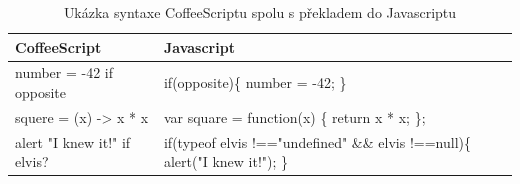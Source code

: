 \begin{table}[h]
\centering
	\caption{Ukázka syntaxe CoffeeScriptu spolu s překladem do Javascriptu \cite{coffeescript} \label{fig:js_vs_coffee}}
	\begin{tabular}{ |p{5cm}|p{5cm}| }
	\hline
	CoffeeScript & Javascript \\ \hline
	number = -42 if opposite & 
	\begin{minipage}[t]{0.2\columnwidth}%
       if(opposite)\{
          \newline
          number = -42;
          \newline
          \}
    \end{minipage}	
	\\ \hline
	squere = (x) -> x * x &	
	\begin{minipage}[t]{0.2\columnwidth}%
       var square = function(x) \{
          \newline
          return x * x;
          \newline
          \};
    \end{minipage}
    \\ \hline
    alert "I knew it!" if elvis? &
    \begin{minipage}[t]{0.4\columnwidth}%
       if(typeof elvis !=="undefined" 
          \newline
          \&\& elvis !==null)\{
          \newline
          alert("I knew it!");
          \newline
          \}
    \end{minipage}
    \\ \hline
	\end{tabular}
	\label{tab:coffeescript}
\end{table}

